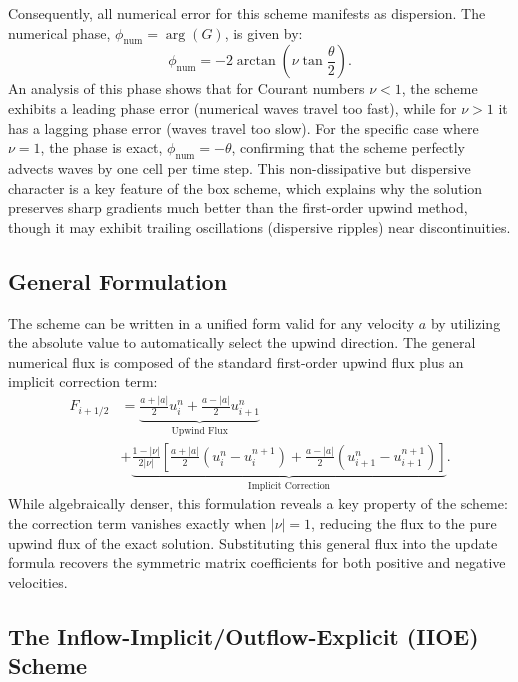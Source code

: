 Consequently, all numerical error for this scheme manifests as dispersion. The numerical phase, \(\phi_{\text{num}} = \arg(G)\), is given by:
\begin{equation}
    \phi_{\text{num}} = -2\arctan\left(\nu\tan\frac{\theta}{2}\right).
    \label{eq:box_scheme_phase}
\end{equation}
An analysis of this phase shows that for Courant numbers \(\nu < 1\), the scheme exhibits a leading phase error (numerical waves travel too fast), while for \(\nu > 1\) it has a lagging phase error (waves travel too slow). For the specific case where \(\nu=1\), the phase is exact, \(\phi_{\text{num}} = -\theta\), confirming that the scheme perfectly advects waves by one cell per time step. This non-dissipative but dispersive character is a key feature of the box scheme, which explains why the solution preserves sharp gradients much better than the first-order upwind method, though it may exhibit trailing oscillations (dispersive ripples) near discontinuities.

\subsection*{General Formulation}
The scheme can be written in a unified form valid for any velocity \( a \) by utilizing the absolute value to automatically select the upwind direction.
The general numerical flux is composed of the standard first-order upwind flux plus an implicit correction term:
\begin{equation}
    \label{eq:second_order_implicit_flux_general}
    \begin{split}
        F_{i+1/2} &= \underbrace{\frac{a+|a|}{2} u_{i}^{n} + \frac{a-|a|}{2} u_{i+1}^{n}}_{\text{Upwind Flux}}  \\
                  &+ 
        \underbrace{\frac{1-|\nu|}{2|\nu|} \left[ \frac{a+|a|}{2} \left( u_{i}^{n} - u_{i}^{n+1} \right) + \frac{a-|a|}{2} \left( u_{i+1}^{n} - u_{i+1}^{n+1} \right) \right]}_{\text{Implicit Correction}}.
    \end{split}
\end{equation}
While algebraically denser, this formulation reveals a key property of the scheme: the correction term vanishes exactly when \( |\nu| = 1 \), reducing the flux to the pure upwind flux of the exact solution. 
Substituting this general flux into the update formula recovers the symmetric matrix coefficients for both positive and negative velocities.

\subsection{The Inflow-Implicit/Outflow-Explicit (IIOE) Scheme}


